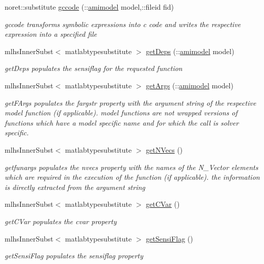 \begin{DoxyCompactItemize}
noret\+::substitute \hyperlink{classamifun_a05444f498e657a0010f6b539bc9c6596}{gccode} (\+::\hyperlink{classamimodel}{amimodel} model,\+::fileid fid)
\begin{DoxyCompactList}\small\item\em gccode transforms symbolic expressions into c code and writes the respective expression into a specified file \end{DoxyCompactList}\item 
mlhs\+Inner\+Subst$<$ matlabtypesubstitute $>$ \hyperlink{classamifun_a1cb97b695ab609e1655ec1067b140b70}{get\+Deps} (\+::\hyperlink{classamimodel}{amimodel} model)
\begin{DoxyCompactList}\small\item\em get\+Deps populates the sensiflag for the requested function \end{DoxyCompactList}\item 
mlhs\+Inner\+Subst$<$ matlabtypesubstitute $>$ \hyperlink{classamifun_a4b16e7670c0d60e530545e58628bde3f}{get\+Args} (\+::\hyperlink{classamimodel}{amimodel} model)
\begin{DoxyCompactList}\small\item\em get\+F\+Args populates the fargstr property with the argument string of the respective model function (if applicable). model functions are not wrapped versions of functions which have a model specific name and for which the call is solver specific. \end{DoxyCompactList}\item 
mlhs\+Inner\+Subst$<$ matlabtypesubstitute $>$ \hyperlink{classamifun_a3ae210044df5eb51e2f9280d03b86c3c}{get\+N\+Vecs} ()
\begin{DoxyCompactList}\small\item\em getfunargs populates the nvecs property with the names of the N\+\_\+\+Vector elements which are required in the execution of the function (if applicable). the information is directly extracted from the argument string \end{DoxyCompactList}\item 
mlhs\+Inner\+Subst$<$ matlabtypesubstitute $>$ \hyperlink{classamifun_a969775839d9d32ff4a0ba70395117ca7}{get\+C\+Var} ()
\begin{DoxyCompactList}\small\item\em get\+C\+Var populates the cvar property \end{DoxyCompactList}\item 
mlhs\+Inner\+Subst$<$ matlabtypesubstitute $>$ \hyperlink{classamifun_ac60147b051aa541057d0da18a78582a8}{get\+Sensi\+Flag} ()
\begin{DoxyCompactList}\small\item\em get\+Sensi\+Flag populates the sensiflag property \end{DoxyCompactList}\end{DoxyCompactItemize}
